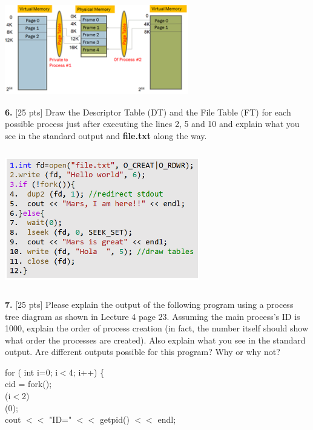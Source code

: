 \documentclass[12pt]{article}
\newcommand\tab[1][1cm]{\hspace*{#1}}
\begin{document}
\begin{center}
\includegraphics[width=8cm, height=4cm]{313Quiz2P5}
\end{center}

{\bf 6.} [25 pts] Draw the Descriptor Table (DT) and the File Table (FT) for each possible process just after executing the lines 2, 5 and 10 and explain what you see in the standard output and {\bf file.txt} along the way. 

\begin{center}
\includegraphics[width=8.5cm, height=6cm]{P6}
\end{center}

{\bf 7.} [25 pts] Please explain the output of the following program using a process tree diagram as shown in Lecture 4 page 23. Assuming the main process's ID is 1000, explain the order of process creation (in fact, the number itself should show what order the processes are created). Also explain what you see in the standard output. Are different outputs possible for this program? Why or why not? 

\noindent
{\color{violet} for} ({\color{blue} int} i={\color{Green}0}; i$<${\color{Green}4}; i++) \{\\
\tab{\color{blue}int} cid = {\color{RawSienna}fork}();\\
\tab{\color{violet}if}(i$<${\color{Green}2})\\
\tab\tab{\color{RawSienna}wait}({\color{Green}0});\\
\tab cout $<<$ {\color{Maroon}"ID="} $<<$ {\color{RawSienna}getpid}() $<<$ endl;\\
\end{document}
